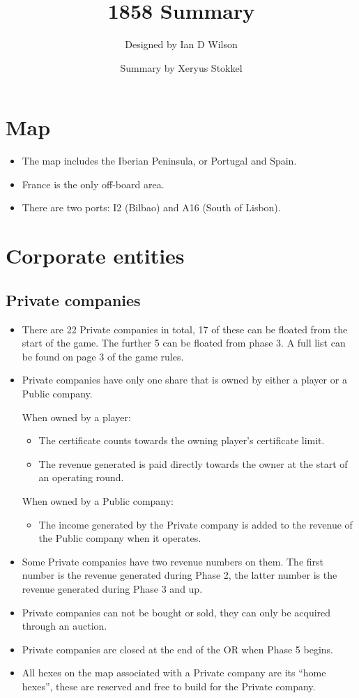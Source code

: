 \documentclass[a4paper]{article}
\title{1858 Summary}
\author{Designed by Ian D Wilson}
\date{Summary by Xeryus Stokkel}
\begin{document}
\maketitle

\section{Map}
\begin{itemize}
	\item The map includes the Iberian Peninsula, or Portugal and Spain.
	\item France is the only off-board area.
	\item There are two ports: I2 (Bilbao) and A16 (South of Lisbon).
\end{itemize}

\section{Corporate entities}
\subsection{Private companies}
\begin{itemize}
	\item There are 22 Private companies in total, 17 of these can be floated
	from the start of the game. The further 5 can be floated from phase 3. A
	full list can be found on page 3 of the game rules.
	\item Private companies have only one share that is owned by either a player
	or a Public company.
	
	When owned by a player:
	\begin{itemize}
		\item The certificate counts towards the owning player's certificate
		limit.
		\item The revenue generated is paid directly towards the owner at the
		start of an operating round.
	\end{itemize}
	When owned by a Public company:
	\begin{itemize}
		\item The income generated by the Private company is added to the
		revenue of the Public company when it operates.
	\end{itemize}
	
	\item Some Private companies have two revenue numbers on them. The first
	number is the revenue generated during Phase 2, the latter number is the
	revenue generated during Phase 3 and up.
	\item Private companies can not be bought or sold, they can only be acquired
	through an auction.
	\item Private companies are closed at the end of the OR when Phase 5 begins.
	\item All hexes on the map associated with a Private company are its ``home
	hexes'', these are reserved and free to build for the Private company.
\end{itemize}
\end{document}
